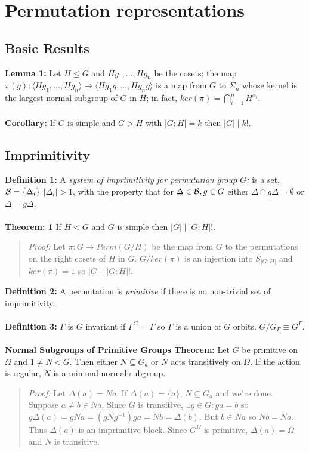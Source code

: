 \chapter{Permutation representations}
\section {Basic Results}
{\bf Lemma 1:} 
Let $H \le G$ and $Hg_1 , ..., Hg_n$ be the cosets; the map
$\pi(g): \langle Hg_1, ..., Hg_n \rangle \mapsto \langle Hg_1 g, ..., Hg_n g \rangle $ 
is a map from $G$ to $\Sigma_n$
whose kernel is the largest normal subgroup of $G$ in $H$; in fact,
$ker(\pi) = \bigcap_{i=1}^n H^{x_i}$.
\\
\\
{\bf Corollary:}  If $G$ is simple and $G > H$ with $|G:H| = k$ then
$|G| \mid k!$.
\section {Imprimitivity}
{\bf Definition 1:}
A \emph{system of imprimitivity for permutation 
group $G$:} is a set, ${\cal B} = \{ \Delta_i\}$ $|\Delta_i| > 1$, with
the property that for $\Delta \in {\cal B}, g \in G$ either 
$\Delta \cap g \Delta = \emptyset$ or
$\Delta = g \Delta$.
\\
\\
{\bf Theorem: 1}
If $H<G$ and $G$ is simple then $|G| \mid |G:H|!$. 
\begin{quote}
\emph{Proof:}  
Let  $\pi: G \rightarrow Perm(G/H)$ be the map from $G$ to the permutations on the right
cosets of $H$ in $G$.  $G/ker(\pi)$ is an injection into $S_{|G:H|}$ and $ker(\pi)=1$ so
$|G| \mid |G:H|!$.
\end{quote}
{\bf Definition 2:}
A permutation is \emph{primitive} if there is no non-trivial set of imprimitivity.
\\
\\
{\bf Definition 3:}
$\Gamma$ is $G$ invariant if $\Gamma^G= \Gamma$ so $\Gamma$ is a union of $G$ orbits.
$G/G_{\Gamma} \equiv G^{\Gamma}$.
\\
\\
{\bf Normal Subgroups of Primitive Groups Theorem:}  
Let $G$ be primitive on $\Omega$ and $1 \ne N \lhd G$.  Then either $N \subseteq G_a$ or
$N$ acts transitively on $\Omega$.  If the action is regular, $N$ is a minimal normal subgroup.
\begin{quote}
\emph{Proof:}  
Let $\Delta(a)= Na$.  If $\Delta(a)= \{ a \}$, $N \subseteq G_a$ and we're done.
Suppose $a \ne b \in Na$.  Since $G$ is transitive, $\exists g \in G: ga=b$ so
$g \Delta(a)= gNa= (gN g^{-1} ) ga= Nb = \Delta(b)$.  But $b \in Na$ so $Nb = Na$.
Thus $\Delta(a)$ is an imprimitive block.  Since $G^{\Omega}$ is primitive, $\Delta(a)= \Omega$
and $N$ is transitive.
\end{quote}
